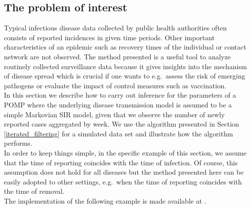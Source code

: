 \subsection{The problem of interest}
Typical  infectious disease data  collected by  public health authorities often consists of reported incidences in given time periods. Other important characteristics of an epidemic such as recovery times of the individual  or contact network are not observed. The method presented is a useful tool to analyze routinely collected surveillance data because it gives insights into the mechanism of  disease spread which is crucial if one wants  to e.g.\ assess the risk of emerging pathogens or evaluate the impact of control measures such as vaccination. \\
In this section we describe how to carry out  inference for the parameters of a POMP where the underlying disease transmission model is assumed to be a simple Markovian SIR model, given  that we observe the number of newly reported cases aggregated by week. 
We use the algorithm presented in Section \ref{iterated_filtering} for a simulated data set and illustrate how the algorithm performs. \\
In order to keep things simple, in the specific example of this section, we assume that the time of reporting coincides with the time of infection.  Of course, this assumption does not hold for all diseases but the
method presented here can be easily adopted to other settings, e.g.\ when the time of  reporting coincides with the time of removal.\\
The implementation of the following example is made available at \cite{theresa_git}.


